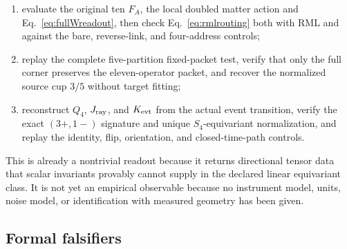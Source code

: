 \documentclass[11pt]{article}
\theoremstyle{definition}
\theoremstyle{remark}
\begin{document}
\begin{enumerate}
\item evaluate the original ten $F_A$, the local doubled matter action and Eq.~\eqref{eq:fullWreadout}, then check Eq.~\eqref{eq:rmlrouting} both with RML and against the bare, reverse-link, and four-address controls;
\item replay the complete five-partition fixed-packet test, verify that only the full corner preserves the eleven-operator packet, and recover the normalized source cup $3/5$ without target fitting;
\item reconstruct $Q_4$, $J_{\rm ray}$, and $K_{\rm evt}$ from the actual event transition, verify the exact $(3+,1-)$ signature and unique $S_4$-equivariant normalization, and replay the identity, flip, orientation, and closed-time-path controls.
\end{enumerate}

This is already a nontrivial readout because it returns directional tensor data that scalar invariants provably cannot supply in the declared linear equivariant class. It is not yet an empirical observable because no instrument model, units, noise model, or identification with measured geometry has been given.

\subsection{Formal falsifiers}
\end{document}
